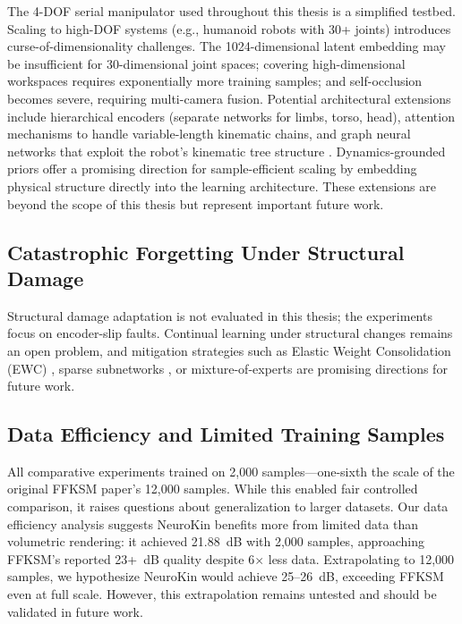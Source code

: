 \documentclass[12pt,a4paper,oneside]{report}
\begin{document}
The 4-DOF serial manipulator used throughout this thesis is a simplified testbed. Scaling to high-DOF systems (e.g., humanoid robots with 30+ joints) introduces curse-of-dimensionality challenges. The 1024-dimensional latent embedding may be insufficient for 30-dimensional joint spaces; covering high-dimensional workspaces requires exponentially more training samples; and self-occlusion becomes severe, requiring multi-camera fusion. Potential architectural extensions include hierarchical encoders (separate networks for limbs, torso, head), attention mechanisms to handle variable-length kinematic chains, and graph neural networks that exploit the robot's kinematic tree structure \cite{patel2024getzero}. Dynamics-grounded priors offer a promising direction for sample-efficient scaling by embedding physical structure directly into the learning architecture. These extensions are beyond the scope of this thesis but represent important future work.
\subsection{Catastrophic Forgetting Under Structural Damage}
\label{subsec:catastrophic_forgetting_under_structural_damage}

Structural damage adaptation is not evaluated in this thesis; the experiments focus on encoder-slip faults. Continual learning under structural changes remains an open problem, and mitigation strategies such as Elastic Weight Consolidation (EWC) \cite{kirkpatrick2017overcoming}, sparse subnetworks \cite{frankle2018lottery}, or mixture-of-experts \cite{mocanu2018scalable} are promising directions for future work.
\subsection{Data Efficiency and Limited Training Samples}
\label{subsec:data_efficiency_and_limited_training_samples}

All comparative experiments trained on 2,000 samples---one-sixth the scale of the original FFKSM paper's 12,000 samples. While this enabled fair controlled comparison, it raises questions about generalization to larger datasets. Our data efficiency analysis suggests NeuroKin benefits more from limited data than volumetric rendering: it achieved 21.88~dB with 2,000 samples, approaching FFKSM's reported 23+~dB quality despite 6$\times$ less data. Extrapolating to 12,000 samples, we hypothesize NeuroKin would achieve 25--26~dB, exceeding FFKSM even at full scale. However, this extrapolation remains untested and should be validated in future work.
\end{document}
